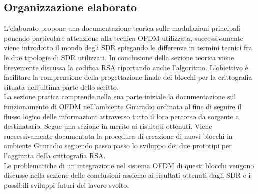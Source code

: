 \subsection{Organizzazione elaborato}L'elaborato propone una documentazione teorica sulle modulazioni principali ponendo particolare attenzione alla tecnica OFDM utilizzata, successivamente viene introdotto il mondo degli SDR spiegando le differenze in termini tecnici fra le due tipologie di SDR utilizzati. In conclusione della sezione teorica viene brevemente discussa la codifica RSA riportando anche l'algoritmo. L'obiettivo è facilitare la comprensione della progettazione finale dei blocchi per la crittografia situata nell'ultima parte dello scritto.
\\La sezione pratica comprende nella sua parte iniziale la documentazione sul funzionamento di OFDM nell'ambiente Gnuradio ordinata al fine di seguire il flusso logico delle informazioni attraverso tutto il loro percorso da sorgente a destinatario. Segue una sezione in merito ai risultati ottenuti.
Viene successivamente documentata la procedura di creazione di nuovi blocchi in ambiente Gnuradio seguendo passo passo lo sviluppo dei due prototipi per l'aggiunta della crittografia RSA.
\\
Le problematiche di un integrazione nel sistema OFDM di questi blocchi vengono discusse nella sezione delle conclusioni assieme ai risultati ottenuti dagli SDR e i possibili sviluppi futuri del lavoro svolto.





\newpage



